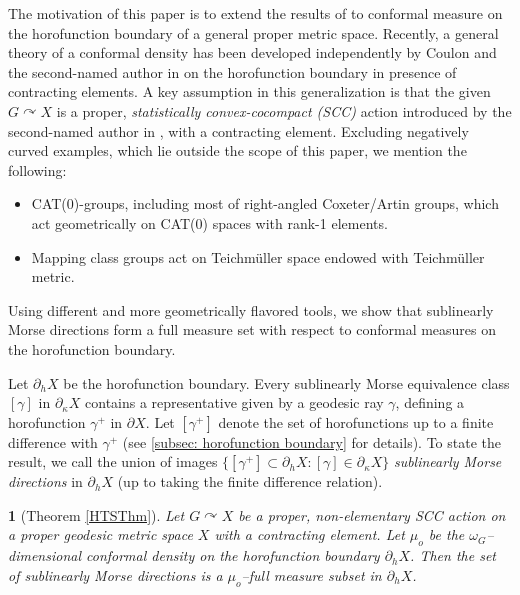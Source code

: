 \documentclass{amsart}
\newtheorem{mainthm}{}
\theoremstyle{definition}
\theoremstyle{remark}
\newcommand{\act}{\curvearrowright}
\newcommand{\U}{ X}
\newcommand{\hU}{\partial_h{  X}}
\newcommand{\pU}{\partial{  X}}
\newcommand{\e}[1]{\omega_{#1}}
\newcommand{\pka}{\partial_\kappa}
\begin{document}
The motivation of this paper is to extend the results of \cite{GQR22} to conformal measure on the horofunction boundary of a general proper metric space. Recently, a general theory of a conformal density has been developed independently by Coulon and the second-named author in \cite{Coulon22, YANG22} on the horofunction boundary in presence of contracting elements. A  key assumption in this generalization is  that the given $G \act X$ is a proper, \emph{statistically convex-cocompact (SCC)} action introduced by the second-named author in \cite{YANG10}, with a contracting element. Excluding negatively curved examples, which lie outside the scope of this paper, we mention the following:
\begin{itemize}
    \item CAT(0)-groups, including most of right-angled Coxeter/Artin groups, which act geometrically on CAT(0) spaces  with {rank-1} elements.
    \item 
    Mapping class groups act on Teichm\"{u}ller space endowed with Teichm\"{u}ller metric.       
\end{itemize}

Using  different and more geometrically flavored tools, we show that sublinearly Morse directions form a full measure set with respect to conformal measures on the horofunction boundary. 

Let $\hU$ be the horofunction boundary. Every sublinearly Morse equivalence class $[\gamma]$ in $\pka \U$ contains a representative given by a geodesic ray $\gamma$,  defining a horofunction $\gamma^+$ in $\pU$. Let $[\gamma^+]$ denote the set of horofunctions up to a finite difference with  $\gamma^+$ (see \textsection \ref{subsec: horofunction boundary} for details). To state the result, we call the union of images $\{[\gamma^+]\subset \hU: [\gamma]\in \pka \U\}$    \emph{sublinearly Morse directions} in $\hU$ (up to taking the finite difference relation). %

\begin{mainthm}[Theorem \ref{HTSThm}]\label{MainThm}
Let $G\act \U$  be a   proper, non-elementary SCC action on a proper geodesic metric space $\U$ with a contracting element. Let $\mu_o$ be the $\e G$--dimensional conformal density on the horofunction boundary $\hU$. Then the set of   sublinearly Morse directions  is a $\mu_o$--full measure subset in $\hU$. 
\end{mainthm}
\end{document}
